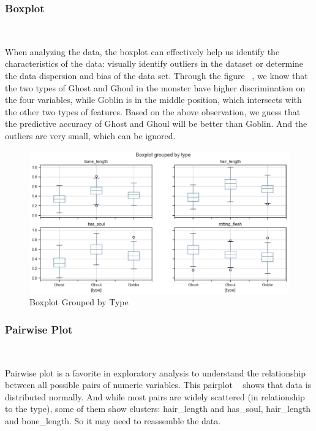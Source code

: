 \subsubsection{Boxplot}
\
 
When analyzing the data, 
the boxplot can effectively 
help us identify the characteristics of the data:
visually identify outliers in the dataset or
determine the data dispersion and 
bias of the data set. 
Through the figure ~, 
we know that the two types of Ghost and Ghoul 
in the monster have higher discrimination 
on the four variables, 
while Goblin is in the middle position, 
which intersects with the other two types of features.
Based on the above observation,
we guess that the predictive accuracy of Ghost and Ghoul 
will be better than Goblin.
And the outliers are very small,
which can be ignored.


\begin{figure}[htbp]
	\centering
	\includegraphics[scale=0.3]{figures/boxplot.eps}
	\caption{Boxplot Grouped by Type}\label{fig:boxplot}
\end{figure}


\subsubsection{Pairwise Plot} 
\

Pairwise plot is 
a favorite in exploratory analysis 
to understand the relationship 
between all possible pairs 
of numeric variables. 
This pairplot ~ 
shows that data is distributed normally. 
And while most pairs are widely scattered 
(in relationship to the type), 
some of them show clusters: 
hair_length and has_soul, 
hair_length and bone_length. 
So it may need to reassemble the data.

